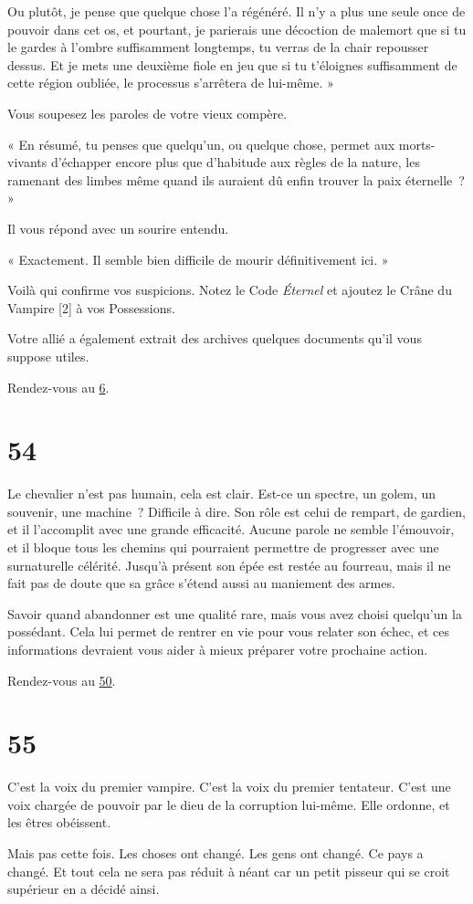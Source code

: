 \documentclass{report}
\newcommand{\gsection}[1]{
    \section{#1}
    \label{section-#1}
}
\newcommand{\glink}[1]{\hyperref[section-#1]{#1}}
\begin{document}
Ou plutôt, je pense que quelque chose l'a régénéré. Il n'y a plus une seule once de pouvoir dans cet os, et pourtant, je parierais une décoction de malemort que si tu le gardes à l'ombre suffisamment longtemps, tu verras de la chair repousser dessus. Et je mets une deuxième fiole en jeu que si tu t'éloignes suffisamment de cette région oubliée, le processus s'arrêtera de lui-même. »

Vous soupesez les paroles de votre vieux compère.

« En résumé, tu penses que quelqu'un, ou quelque chose, permet aux morts-vivants d'échapper encore plus que d'habitude aux règles de la nature, les ramenant des limbes même quand ils auraient dû enfin trouver la paix éternelle ? »

Il vous répond avec un sourire entendu.

« Exactement. Il semble bien difficile de mourir définitivement ici. »

Voilà qui confirme vos suspicions. Notez le Code \emph{Éternel} et ajoutez le Crâne du Vampire [2] à vos Possessions.

Votre allié a également extrait des archives quelques documents qu'il vous suppose utiles.

Rendez-vous au \glink{6}.

\gsection{54}

Le chevalier n'est pas humain, cela est clair. Est-ce un spectre, un golem, un souvenir, une machine ? Difficile à dire. Son rôle est celui de rempart, de gardien, et il l'accomplit avec une grande efficacité. Aucune parole ne semble l'émouvoir, et il bloque tous les chemins qui pourraient permettre de progresser avec une surnaturelle célérité. Jusqu'à présent son épée est restée au fourreau, mais il ne fait pas de doute que sa grâce s'étend aussi au maniement des armes.

Savoir quand abandonner est une qualité rare, mais vous avez choisi quelqu'un la possédant. Cela lui permet de rentrer en vie pour vous relater son échec, et ces informations devraient vous aider à mieux préparer votre prochaine action.

Rendez-vous au \glink{50}.

\gsection{55}

C'est la voix du premier vampire. C'est la voix du premier tentateur. C'est une voix chargée de pouvoir par le dieu de la corruption lui-même. Elle ordonne, et les êtres obéissent.

Mais pas cette fois. Les choses ont changé. Les gens ont changé. Ce pays a changé. Et tout cela ne sera pas réduit à néant car un petit pisseur qui se croit supérieur en a décidé ainsi.
\end{document}
